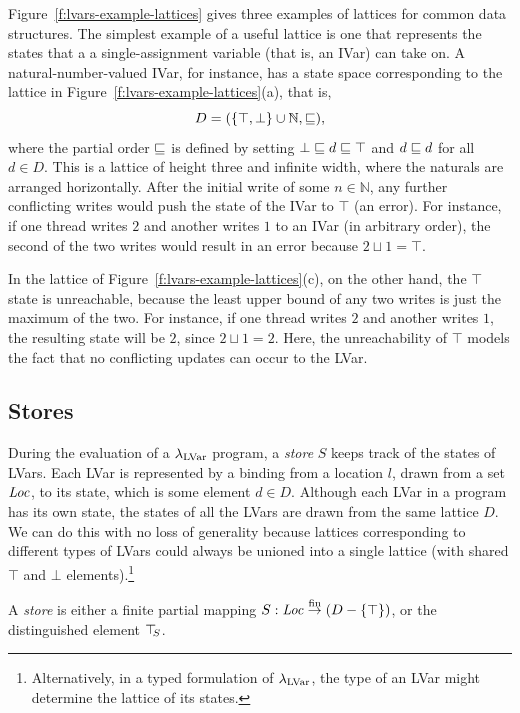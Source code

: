 Figure~\ref{f:lvars-example-lattices} gives three examples of lattices
for common data structures.  The simplest example of a useful lattice
is one that represents the states that a a single-assignment variable
(that is, an IVar) can take on.  A natural-number-valued IVar, for
instance, has a state space corresponding to the lattice in
Figure~\ref{f:lvars-example-lattices}(a), that is,
\begin{displaymath}
  D = (\lbrace \top, \bot \rbrace \cup \mathbb{N}, \sqsubseteq), 
\end{displaymath}
where the partial order $\sqsubseteq$ is defined by setting $\bot \sqsubseteq d
\sqsubseteq \top$ and $d \sqsubseteq d$ for all $d \in D$.  This is a lattice of
height three and infinite width, where the naturals are arranged
horizontally.  After the initial write of some $n \in \mathbb{N}$, any
further conflicting writes would push the state of the IVar to $\top$
(an error).  For instance, if one thread writes $2$ and another writes
$1$ to an IVar (in arbitrary order), the second of the two writes
would result in an error because $2 \sqcup 1 = \top$.

In the lattice of Figure~\ref{f:lvars-example-lattices}(c), on the
other hand, the $\top$ state is unreachable, because the least upper
bound of any two writes is just the maximum of the two.  For instance,
if one thread writes $2$ and another writes $1$, the resulting state
will be $2$, since $2 \sqcup 1 = 2$.  Here, the unreachability of
$\top$ models the fact that no conflicting updates can occur to the
LVar.

\subsection{Stores}\label{subsection:stores}

During the evaluation of a $\lambda_{\textrm{LVar}}$ program, a \emph{store} $S$
keeps track of the states of LVars.  Each LVar is represented by a
binding from a location $l$, drawn from a set $\mathit{Loc}$, to its state,
which is some element $d \in D$.  Although each LVar in a program has
its own state, the states of all the LVars are drawn from the same
lattice $D$.  We can do this with no loss of generality because
lattices corresponding to different types of LVars could always be
unioned into a single lattice (with shared $\top$ and $\bot$
elements).\footnote{Alternatively, in a typed formulation of
$\lambda_{\textrm{LVar}}$, the type of an LVar might determine the lattice of its
states.}

\begin{definition}\label{def:store}
A \emph{store} is either a finite partial mapping $S : \mathit{Loc} \stackrel{\textrm{fin}}{\rightarrow}
(D-\lbrace \top \rbrace)$, or the distinguished element $\top\hspace{-0.85mm}_{S}$.
\end{definition}

